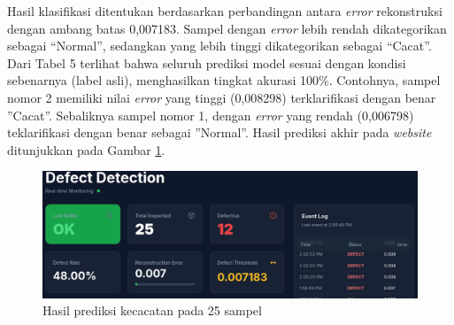 Hasil klasifikasi ditentukan berdasarkan perbandingan antara \textit{error}
rekonstruksi dengan ambang batas 0,007183. Sampel dengan \textit{error} lebih
rendah dikategorikan sebagai “Normal”, sedangkan yang lebih tinggi
dikategorikan sebagai “Cacat”. Dari Tabel 5 terlihat bahwa seluruh
prediksi model sesuai dengan kondisi sebenarnya (label asli),
menghasilkan tingkat akurasi 100\%. Contohnya, sampel nomor 2 memiliki
nilai \textit{error} yang tinggi (0,008298) terklarifikasi dengan benar
”Cacat”. Sebaliknya sampel nomor 1, dengan \textit{error} yang rendah
(0,006798) teklarifikasi dengan benar sebagai ”Normal”. Hasil
prediksi akhir pada \textit{website} ditunjukkan pada Gambar
\ref{fig:web-25}.

\begin{figure}[H]
  \centering
  \includegraphics[width=\textwidth]{gambar/ss_web_25.png}
  \caption{Hasil prediksi kecacatan pada 25 sampel}
  \label{fig:web-25}
\end{figure}
\vspace{-1em}
